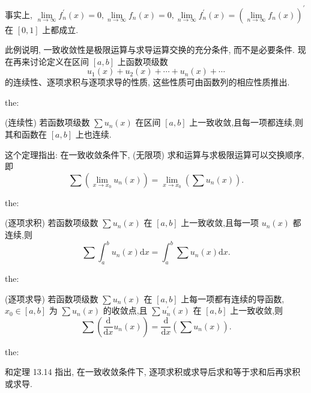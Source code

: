 事实上, \(\mathop{\lim }\limits_{{n \rightarrow  \infty }}{f}_{n}^{\prime }\left( x\right)  = 0,\mathop{\lim }\limits_{{n \rightarrow  \infty }}{f}_{n}\left( x\right)  = 0,\mathop{\lim }\limits_{{n \rightarrow  \infty }}{f}_{n}^{\prime }\left( x\right)  = {\left( \mathop{\lim }\limits_{{n \rightarrow  \infty }}{f}_{n}\left( x\right) \right) }^{\prime }\) 在 \(\left\lbrack  {0,1}\right\rbrack\) 上都成立.

此例说明, 一致收敛性是极限运算与求导运算交换的充分条件, 而不是必要条件. 现在再来讨论定义在区间 \(\left\lbrack  {a,b}\right\rbrack\) 上函数项级数
\[
{u}_{1}\left( x\right)  + {u}_{2}\left( x\right)  + \cdots  + {u}_{n}\left( x\right)  + \cdots  \tag{5}
\]
的连续性、逐项求积与逐项求导的性质, 这些性质可由函数列的相应性质推出.

\begin{theorem}{}{the:}

\end{theorem}
 (连续性) 若函数项级数 \(\sum {u}_{n}\left( x\right)\) 在区间 \(\left\lbrack  {a,b}\right\rbrack\) 上一致收敛,且每一项都连续,则其和函数在 \(\left\lbrack  {a,b}\right\rbrack\) 上也连续.


这个定理指出: 在一致收敛条件下, (无限项) 求和运算与求极限运算可以交换顺序, 即
\[
\sum \left( {\mathop{\lim }\limits_{{x \rightarrow  {x}_{0}}}{u}_{n}\left( x\right) }\right)  = \mathop{\lim }\limits_{{x \rightarrow  {x}_{0}}}\left( {\sum {u}_{n}\left( x\right) }\right) . \tag{6}
\]
\begin{theorem}{}{the:}

\end{theorem}
 (逐项求积) 若函数项级数 \(\sum {u}_{n}\left( x\right)\) 在 \(\left\lbrack  {a,b}\right\rbrack\) 上一致收敛,且每一项 \({u}_{n}\left( x\right)\) 都连续,则
\[
\sum {\int }_{a}^{b}{u}_{n}\left( x\right) \mathrm{d}x = {\int }_{a}^{b}\sum {u}_{n}\left( x\right) \mathrm{d}x. \tag{7}
\]
\begin{theorem}{}{the:}

\end{theorem}
 (逐项求导) 若函数项级数 \(\sum {u}_{n}\left( x\right)\) 在 \(\left\lbrack  {a,b}\right\rbrack\) 上每一项都有连续的导函数, \({x}_{0} \in  \left\lbrack  {a,b}\right\rbrack\) 为 \(\sum {u}_{n}\left( x\right)\) 的收敛点,且 \(\sum {u}_{n}^{\prime }\left( x\right)\) 在 \(\left\lbrack  {a,b}\right\rbrack\) 上一致收敛,则
\[
\sum \left( {\frac{\mathrm{d}}{\mathrm{d}x}{u}_{n}\left( x\right) }\right)  = \frac{\mathrm{d}}{\mathrm{d}x}\left( {\sum {u}_{n}\left( x\right) }\right) . \tag{8}
\]
\begin{theorem}{}{the:}

\end{theorem}
 和定理 13.14 指出, 在一致收敛条件下, 逐项求积或求导后求和等于求和后再求积或求导.

